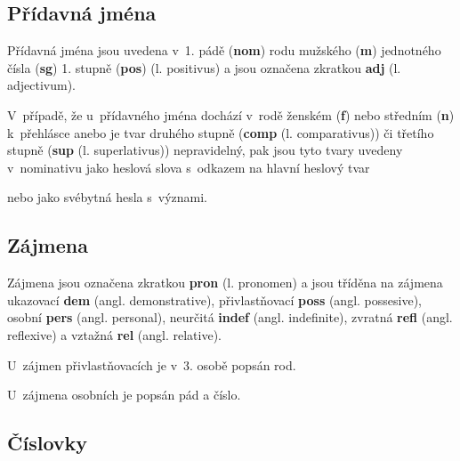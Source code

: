\blspace
  \dicEntry {} 
  \dicEntry {} 
\blspace

\subsection*{Přídavná jména}

Přídavná jména jsou uvedena v~1. pádě (\textbf{nom}) rodu mužského (\textbf{m}) jednotného čísla (\textbf{sg}) 1. stupně (\textbf{pos}) (l. positivus) a jsou označena zkratkou \textbf{adj} (l. adjectivum).

\blspace
  \dicEntry {} 
\blspace

V~případě, že u~přídavného jména dochází v~rodě ženském (\textbf{f}) nebo středním (\textbf{n}) k~přehlásce anebo je tvar druhého stupně (\textbf{comp} (l. comparativus)) či třetího stupně (\textbf{sup} (l. superlativus)) nepravidelný, pak jsou tyto tvary uvedeny v~nominativu jako heslová slova s~odkazem na hlavní heslový tvar

\blspace
  \dicEntry {}   
\blspace

nebo jako svébytná hesla s~význami.

\blspace
  \dicEntry {}  
\blspace

\subsection*{Zájmena}

Zájmena jsou označena zkratkou \textbf{pron} (l. pronomen) a jsou tříděna na zájmena ukazovací \textbf{dem} (angl. demonstrative), přivlastňovací \textbf{poss} (angl. possesive), osobní \textbf{pers} (angl. personal), neurčitá \textbf{indef} (angl. indefinite), zvratná \textbf{refl} (angl. reflexive) a vztažná \textbf{rel} (angl. relative).

\blspace
  \dicEntry {}  
\blspace

U~zájmen přivlastňovacích je v~3. osobě popsán rod.

\blspace
  \dicEntry {}  
\blspace

U~zájmena osobních je popsán pád a číslo.

\blspace
  \dicEntry {}  
\blspace

\subsection*{Číslovky}

